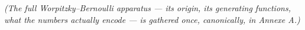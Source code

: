 % 
% 
% 
% 
% 
% 
\textit{(The full Worpitzky--Bernoulli apparatus --- its origin, its generating functions, what the numbers actually encode --- is gathered once, canonically, in Annexe A.)}


